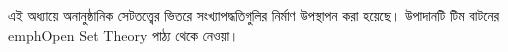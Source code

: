 \documentclass[../../../include/open-logic-section]{subfiles}
\begin{document}

\begin{editorial}
এই অধ্যায়ে অনানুষ্ঠানিক সেটতত্ত্বের ভিতরে সংখ্যাপদ্ধতিগুলির নির্মাণ উপস্থাপন করা হয়েছে। উপাদানটি টিম বাটনের emph{Open Set Theory} পাঠ্য থেকে নেওয়া।
\end{editorial}


\OLEndChapterHook
\end{document}
